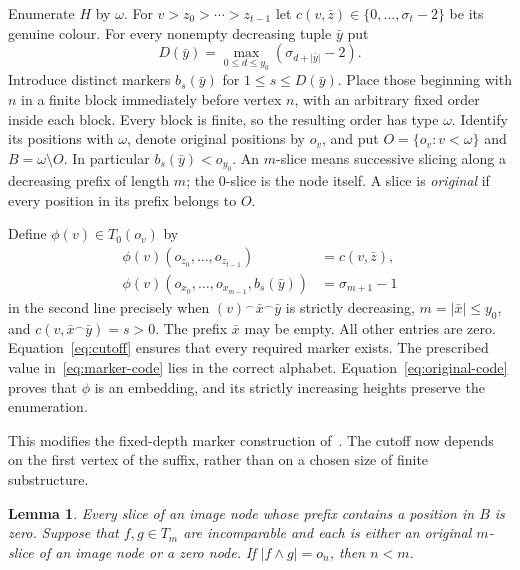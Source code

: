 \documentclass{article}
\numberwithin{equation}{section}
\newtheorem{lemma}[theorem]{Lemma}
\theoremstyle{definition}
\newcommand{\N}{\omega}
\newcommand{\cat}{\mathbin{{}^\frown}}
\begin{document}
Enumerate $H$ by $\N$. For $v>z_0>\cdots>z_{t-1}$ let
$c(v,\bar z)\in\{0,\ldots,\sigma_t-2\}$ be its genuine colour.
For every nonempty decreasing tuple $\bar y$ put
\begin{equation}\label{eq:cutoff}
D(\bar y)=\max_{0\leq d\leq y_0}(\sigma_{d+|\bar y|}-2).
\end{equation}
Introduce distinct markers $b_s(\bar y)$ for $1\leq s\leq D(\bar y)$.
Place those beginning with $n$ in a finite block immediately before vertex
$n$, with an arbitrary fixed order inside each block. Every block is finite,
so the resulting order has type $\omega$.
Identify its positions with $\N$, denote original positions by $o_v$, and put
$O=\{o_v:v<\omega\}$ and $B=\N\setminus O$. In particular
$b_s(\bar y)<o_{y_0}$.
An $m$-slice means successive slicing along a decreasing prefix of length
$m$; the $0$-slice is the node itself. A slice is \emph{original} if every
position in its prefix belongs to $O$.

Define $\phi(v)\in T_0(o_v)$ by
\begin{align}
\phi(v)(o_{z_0},\ldots,o_{z_{t-1}})&=c(v,\bar z),\label{eq:original-code}\\
\phi(v)(o_{x_0},\ldots,o_{x_{m-1}},b_s(\bar y))
 &=\sigma_{m+1}-1\label{eq:marker-code}
\end{align}
in the second line precisely when $(v)\cat\bar x\cat\bar y$ is strictly
decreasing, $m=|\bar x|\leq y_0$, and $c(v,\bar x\cat\bar y)=s>0$.
The prefix $\bar x$ may be empty. All other entries are zero.
Equation~\eqref{eq:cutoff} ensures that every required marker exists.
The prescribed value in~\eqref{eq:marker-code} lies in the correct alphabet.
Equation~\eqref{eq:original-code} proves that $\phi$ is an embedding, and its
strictly increasing heights preserve the enumeration.

This modifies the fixed-depth marker construction
of~\cite[Lemma~4.3]{InfiniteLanguages}. The cutoff now depends on the first
vertex of the suffix, rather than on a chosen size of finite substructure.

\begin{lemma}\label{lem:weak-meets}
Every slice of an image node whose prefix contains a position in $B$ is zero.
Suppose that $f,g\in T_m$ are incomparable and each is either an original
$m$-slice of an image node or a zero node. If $|f\wedge g|=o_n$, then $n<m$.
\end{lemma}
\end{document}

